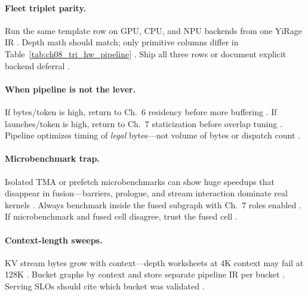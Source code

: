 \paragraph{Fleet triplet parity.}
Run the same template row on GPU, CPU, and NPU backends from one YiRage IR \citep{yirage2026,patel2025llminference,amd2024xdna,nvidia2022hopper}.
Depth math should match; only primitive columns differ in Table~\ref{tab:ch08_tri_hw_pipeline} \citep{chen2020compilerbasedhardw,taxbreak2026,amd2024aie}.
Ship all three rows or document explicit backend deferral \citep{wu2024mirage,mpk2025}.

\paragraph{When pipeline is not the lever.}
If bytes/token is high, return to Ch.~6 residency before more buffering \citep{memoryfloor2026,dao2022flashattention,yirage2026}.
If launches/token is high, return to Ch.~7 staticization before overlap tuning \citep{taxbreak2026,mpk2025,nvidia2024cudagraphs}.
Pipeline optimizes timing of \emph{legal} bytes---not volume of bytes or dispatch count \citep{patel2025llminference,shah2024flashattention3,semianalysis2024tma}.

\paragraph{Microbenchmark trap.}
Isolated TMA or prefetch microbenchmarks can show huge speedups that disappear in fusion---barriers, prologue, and stream interaction dominate real kernels \citep{shah2024flashattention3,semianalysis2024tma,yirage2026}.
Always benchmark inside the fused subgraph with Ch.~7 roles enabled \citep{mpk2025,patel2025llminference,taxbreak2026}.
If microbenchmark and fused cell disagree, trust the fused cell \citep{memoryfloor2026,chen2020compilerbasedhardw,dao2022flashattention}.

\paragraph{Context-length sweeps.}
KV stream bytes grow with context---depth worksheets at 4K context may fail at 128K \citep{kwon2023vllm,dao2023flashdecoding,patel2025llminference}.
Bucket graphs by context and store separate pipeline IR per bucket \citep{nvidia2024cudagraphs,yirage2026,shah2024flashattention3}.
Serving SLOs should cite which bucket was validated \citep{taxbreak2026,memoryfloor2026,chen2020compilerbasedhardw}.

